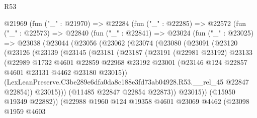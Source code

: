 \begin{lexlean}{R53}
\begin{coremodule}
        @21969
          (fun ("_" : @21970) =>
          @22284
            (fun ("_" : @22285) =>
            @22572
              (fun ("_" : @22573) =>
              @22840
                (fun ("_" : @22841) =>
                @23024
                  (fun ("_" : @23025) =>
                  @23038
                    (@23044
                      (@23056
                        (@23062
                          (@23074
                            (@23080
                              (@23091
                                (@23120
                                  (@23126
                                    (@23139
                                      (@23145
                                        (@23181
                                          (@23187
                                            (@23191
                                              (@22981 @23192)
                                              @23133
                                              (@22989
                                                @1732
                                                @4601
                                                @22859
                                                @22968
                                                @23192
                                                @23001
                                                (@23146
                                                  @124
                                                  @22857
                                                  @4601
                                                  @23131
                                                  @4462
                                                  @23180
                                                  @23015))
                                              (LexLeanPreserve.C3be289e6dfa0da8c188e3fd73ab04928.R53.__rel_45
                                                @22847
                                                @22854))
                                            @23015)))
                                      (@11485 @22847 @22854 @22873))
                                    @23015))
                                (@15950 @19349 @22882))
                              (@22988
                                @1960
                                @124
                                @19358
                                @4601
                                @23069
                                @4462
                                (@23098
                                  @1959
                                  @4603

\end{coremodule}
\end{lexlean}
